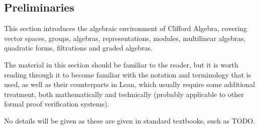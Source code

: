 \subsection{Preliminaries}

This section introduces the algebraic environment of Clifford Algebra,
covering vector spaces, groups, algebras, representations, modules, multilinear algebras,
quadratic forms, filtrations and graded algebras.

The material in this section should be familiar to the reader, but it is worth reading
 through it to become familiar with the notation and terminology that is used,
 as well as their counterparts in Lean, which usually require some additional treatment, both
 mathematically and technically (probably applicable to other formal proof verification systems).

No details will be given as these are given in standard textbooks, such as TODO.